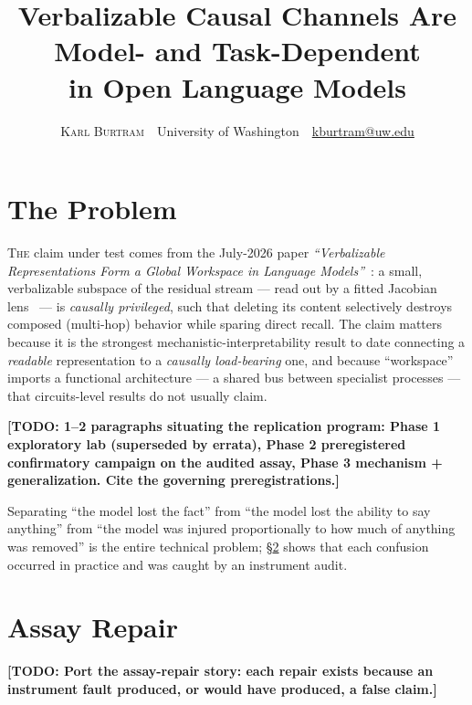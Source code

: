 \documentclass[twoside,twocolumn]{article}
\title{Verbalizable Causal Channels Are Model- and Task-Dependent\\in Open Language Models}
\author{\textsc{Karl Burtram} \,\textperiodcentered\, University of Washington \,\textperiodcentered\, \href{mailto:kburtram@uw.edu}{kburtram@uw.edu}}
\date{}
\newcommand{\todo}[1]{{\color{red!70!black}\textbf{[TODO: #1]}}}
\begin{document}
\maketitle
\thispagestyle{empty}

\section{The Problem}\label{sec:problem}

\lettrine[nindent=0em,lines=2]{T}{he} claim under test comes from the
July-2026 paper \emph{``Verbalizable Representations Form a Global
Workspace in Language Models''}~\cite{Anthropic:Workspace}: a small,
verbalizable subspace of the residual stream --- read out by a fitted
Jacobian lens~\cite{Anthropic:JLens} --- is \emph{causally privileged},
such that deleting its content selectively destroys composed (multi-hop)
behavior while sparing direct recall.  The claim matters because it is
the strongest mechanistic-interpretability result to date connecting a
\emph{readable} representation to a \emph{causally load-bearing} one,
and because ``workspace'' imports a functional architecture --- a shared
bus between specialist processes --- that circuits-level results do not
usually claim.

\todo{1--2 paragraphs situating the replication program: Phase 1
exploratory lab (superseded by errata), Phase 2 preregistered
confirmatory campaign on the audited assay, Phase 3 mechanism +
generalization.  Cite the governing preregistrations.}

Separating ``the model lost the fact'' from ``the model lost the
ability to say anything'' from ``the model was injured proportionally
to how much of anything was removed'' is the entire technical problem;
\S\ref{sec:repair} shows that each confusion occurred in practice and
was caught by an instrument audit.

\section{Assay Repair}\label{sec:repair}

\todo{Port the assay-repair story: each repair exists because an
instrument fault produced, or would have produced, a false claim.}
\end{document}
